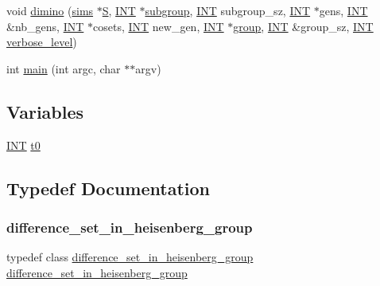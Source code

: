 \begin{DoxyCompactItemize}
void \mbox{\hyperlink{tao_8_c_ab251b50223d5b8ccec828c043255f2f0}{dimino}} (\mbox{\hyperlink{classsims}{sims}} $\ast$\mbox{\hyperlink{simeon_8_c_adab47f8243f1b5a2c31df2535d6b37d0}{S}}, \mbox{\hyperlink{galois_8h_a09fddde158a3a20bd2dcadb609de11dc}{I\+NT}} $\ast$\mbox{\hyperlink{classsubgroup}{subgroup}}, \mbox{\hyperlink{galois_8h_a09fddde158a3a20bd2dcadb609de11dc}{I\+NT}} subgroup\+\_\+sz, \mbox{\hyperlink{galois_8h_a09fddde158a3a20bd2dcadb609de11dc}{I\+NT}} $\ast$gens, \mbox{\hyperlink{galois_8h_a09fddde158a3a20bd2dcadb609de11dc}{I\+NT}} \&nb\+\_\+gens, \mbox{\hyperlink{galois_8h_a09fddde158a3a20bd2dcadb609de11dc}{I\+NT}} $\ast$cosets, \mbox{\hyperlink{galois_8h_a09fddde158a3a20bd2dcadb609de11dc}{I\+NT}} new\+\_\+gen, \mbox{\hyperlink{galois_8h_a09fddde158a3a20bd2dcadb609de11dc}{I\+NT}} $\ast$\mbox{\hyperlink{classgroup}{group}}, \mbox{\hyperlink{galois_8h_a09fddde158a3a20bd2dcadb609de11dc}{I\+NT}} \&group\+\_\+sz, \mbox{\hyperlink{galois_8h_a09fddde158a3a20bd2dcadb609de11dc}{I\+NT}} \mbox{\hyperlink{simeon_8_c_a818073fbcc2f439e7c56952f67386122}{verbose\+\_\+level}})
\item 
int \mbox{\hyperlink{tao_8_c_a3c04138a5bfe5d72780bb7e82a18e627}{main}} (int argc, char $\ast$$\ast$argv)
\end{DoxyCompactItemize}
\subsection*{Variables}
\begin{DoxyCompactItemize}
\item 
\mbox{\hyperlink{galois_8h_a09fddde158a3a20bd2dcadb609de11dc}{I\+NT}} \mbox{\hyperlink{tao_8_c_a4268f4fe222ffb119218a0199f5e1904}{t0}}
\end{DoxyCompactItemize}


\subsection{Typedef Documentation}
\mbox{\label{tao_8_c_aad314b371dabdcf621b78db5725d099e}} 
\subsubsection{\texorpdfstring{difference\+\_\+set\+\_\+in\+\_\+heisenberg\+\_\+group}{difference\_set\_in\_heisenberg\_group}}
{\footnotesize\ttfamily typedef class \mbox{\hyperlink{classdifference__set__in__heisenberg__group}{difference\+\_\+set\+\_\+in\+\_\+heisenberg\+\_\+group}} \mbox{\hyperlink{classdifference__set__in__heisenberg__group}{difference\+\_\+set\+\_\+in\+\_\+heisenberg\+\_\+group}}}



